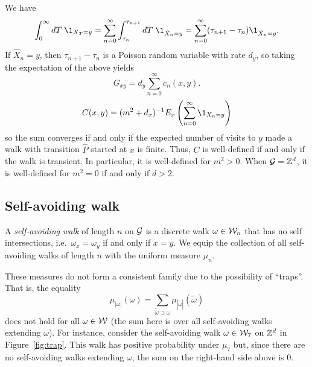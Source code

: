 \begin{example}
We have
\begin{equation}
\int_0^\infty dT \; \1_{X_T=y}
  =
\sum_{n=0}^\infty \int_{\tau_n}^{\tau_{n+1}} dT \; \1_{\hat X_n=y}
  =
\sum_{n=0}^\infty (\tau_{n+1} - \tau_n) \1_{\hat X_n=y}.
\end{equation}
If $\hat X_n = y$, then $\tau_{n+1} - \tau_n$ is a Poisson random variable with rate $d_y$,
so taking the expectation of the above yields
\begin{equation}
G_{xy} = d_y \sum_{n=0}^\infty c_n(x, y).
\end{equation}
\begin{equation}
C(x, y) = (m^2 + d_x)^{-1} E_x \left(\sum_{n=0}^\infty \1_{X_n=y} \right)
\end{equation}
so the sum converges if and only if the expected number of visits to $y$
made a walk with transition $\hat P$ started at $x$ is finite. Thus, $C$ is
well-defined if and only if the walk is transient.
In particular, it is well-defined for $m^2 > 0$. When $\mathcal{G} = { {{\mathbb Z}}^d }$, it is
well-defined for $m^2 = 0$ if and only if $d > 2$.
\end{example}

\begin{example}
\end{example}


\subsection{Self-avoiding walk}

A \emph{self-avoiding walk} of length $n$ on $\mathcal{G}$ is a discrete walk $\omega\in\mathcal{W}_n$
that has no self intersections, i.e.\ $\omega_x = \omega_y$ if and only if $x = y$.
We equip the collection of all self-avoiding walks of length $n$ with the uniform measure $\mu_n$.

These measures do not form a consistent family due to the possibility of ``traps''.
That is, the equality
\begin{equation}
\mu_{|\omega|}(\omega) = \sum_{\tilde\omega \supset \omega} \mu_{|\tilde\omega|}(\tilde\omega)
\end{equation}
does not hold for all $\omega\in\mathcal{W}$ (the sum here is over all self-avoiding walks extending
$\omega$).
For instance, consider the self-avoiding walk $\omega\in\mathcal{W}_7$ on ${ {{\mathbb Z}}^d }$ in
Figure~\ref{fig:trap}.
This walk has positive probability under $\mu_7$ but,
since there are no self-avoiding walks extending $\omega$, the sum on the right-hand side
above is $0$.

